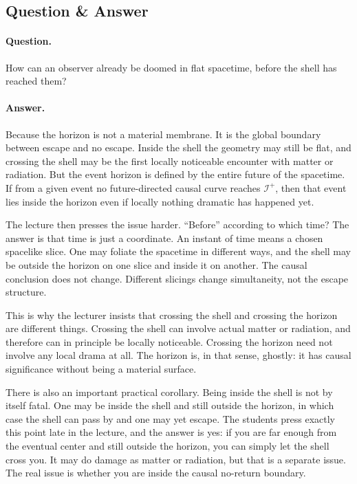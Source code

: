 \subsection{Question \& Answer}

\paragraph{Question.} How can an observer already be doomed in flat spacetime, before the shell has reached them?

\paragraph{Answer.} Because the horizon is not a material membrane. It is the global boundary between escape and no escape. Inside the shell the geometry may still be flat, and crossing the shell may be the first locally noticeable encounter with matter or radiation. But the event horizon is defined by the entire future of the spacetime. If from a given event no future-directed causal curve reaches \(\mathcal{I}^+\), then that event lies inside the horizon even if locally nothing dramatic has happened yet.

The lecture then presses the issue harder. ``Before'' according to which time? The answer is that time is just a coordinate. An instant of time means a chosen spacelike slice. One may foliate the spacetime in different ways, and the shell may be outside the horizon on one slice and inside it on another. The causal conclusion does not change. Different slicings change simultaneity, not the escape structure.

This is why the lecturer insists that crossing the shell and crossing the horizon are different things. Crossing the shell can involve actual matter or radiation, and therefore can in principle be locally noticeable. Crossing the horizon need not involve any local drama at all. The horizon is, in that sense, ghostly: it has causal significance without being a material surface.

There is also an important practical corollary. Being inside the shell is not by itself fatal. One may be inside the shell and still outside the horizon, in which case the shell can pass by and one may yet escape. The students press exactly this point late in the lecture, and the answer is yes: if you are far enough from the eventual center and still outside the horizon, you can simply let the shell cross you. It may do damage as matter or radiation, but that is a separate issue. The real issue is whether you are inside the causal no-return boundary.

